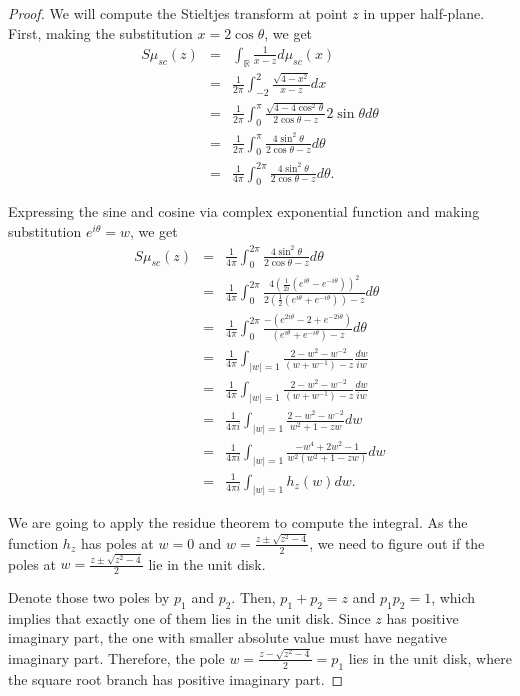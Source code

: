 \documentclass[12pt,a4paper,leqno]{report}
\newcommand{\R}{\mathbb{R}}
\theoremstyle{plain}
\theoremstyle{definition}
\theoremstyle{remark}
\begin{document}
\begin{proof}
We will compute the Stieltjes transform at point $z$ in upper half-plane. First, making the substitution $x = 2 \cos \theta$, we get
\begin{eqnarray*}
S\mu_{sc}(z) & = & \int_{\R} \frac{1}{x-z} d\mu_{sc}(x)\\
& = & \frac{1}{2\pi} \int_{-2}^2 \frac{\sqrt{4-x^2}}{x-z} dx\\
& = & \frac{1}{2\pi} \int_{0}^{\pi} \frac{\sqrt{4-4\cos^2\theta}}{2\cos\theta -z} 2 \sin\theta d\theta\\
& = & \frac{1}{2\pi} \int_{0}^{\pi} \frac{4\sin^2\theta}{2\cos\theta -z} d\theta\\
& = & \frac{1}{4\pi} \int_{0}^{2\pi} \frac{4\sin^2\theta}{2\cos\theta -z} d\theta.
\end{eqnarray*}

Expressing the sine and cosine via complex exponential function and making substitution $e^{i\theta} = w$, we get
\begin{eqnarray*}
S\mu_{sc}(z) & = & \frac{1}{4\pi} \int_{0}^{2\pi} \frac{4\sin^2\theta}{2\cos\theta -z} d\theta\\
& = & \frac{1}{4\pi} \int_{0}^{2\pi} \frac{4(\frac{1}{2i}(e^{i\theta}-e^{-i\theta}))^2}{2(\frac{1}{2}(e^{i\theta}+e^{-i\theta})) -z} d\theta\\
& = & \frac{1}{4\pi} \int_{0}^{2\pi} \frac{-(e^{2i\theta}-2+e^{-2i\theta})}{(e^{i\theta}+e^{-i\theta}) -z} d\theta\\
& = & \frac{1}{4\pi} \int_{|w|=1} \frac{2-w^2-w^{-2}}{(w+w^{-1}) -z} \frac{dw}{iw}\\
& = & \frac{1}{4\pi} \int_{|w|=1} \frac{2-w^2-w^{-2}}{(w+w^{-1}) -z} \frac{dw}{iw}\\
& = & \frac{1}{4\pi i} \int_{|w|=1} \frac{2-w^2-w^{-2}}{w^2+1 -zw} dw\\
& = & \frac{1}{4\pi i} \int_{|w|=1} \frac{-w^4+2w^2-1}{w^2(w^2+1 -zw)} dw\\
& = & \frac{1}{4\pi i} \int_{|w|=1} h_z(w) dw.
\end{eqnarray*}

We are going to apply the residue theorem to compute the integral. As the function $h_z$ has poles at $w=0$ and $w=\frac{z \pm \sqrt{z^2-4}}{2}$, we need to figure out if the poles at $w=\frac{z \pm \sqrt{z^2-4}}{2}$ lie in the unit disk.

Denote those two poles by $p_1$ and $p_2$. Then, $p_1 + p_2 = z$ and $p_1p_2=1$, which implies that exactly one of them lies in the unit disk. Since $z$ has positive imaginary part, the one with smaller absolute value must have negative imaginary part.
Therefore, the pole $w=\frac{z - \sqrt{z^2-4}}{2} = p_1$ lies in the unit disk, where the square root branch has positive imaginary part.


\end{proof}
\end{document}
